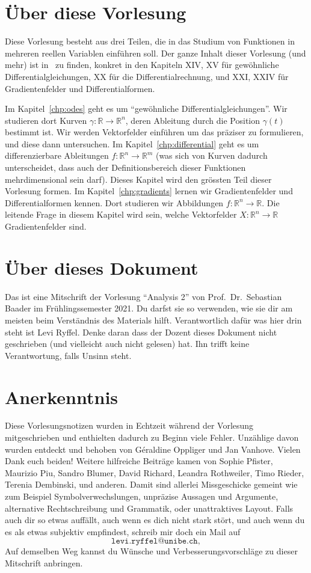 \documentclass[../main.tex]{subfiles}
\begin{document}
\section*{Über diese Vorlesung}
Diese Vorlesung besteht aus drei Teilen,
die in das Studium von Funktionen
in mehreren reellen Variablen
einführen soll. Der ganze Inhalt
dieser Vorlesung (und mehr) ist in~\cite{heuser}
zu finden,
konkret in den Kapiteln XIV, XV für
gewöhnliche Differentialgleichungen,
XX für die Differentialrechnung,
und XXI, XXIV für Gradientenfelder
und Differentialformen.

Im Kapitel~\ref{chp:odes} geht es um
``gewöhnliche Differentialgleichungen''.
Wir studieren dort Kurven
$\gamma \colon \mathbb{R} \to \mathbb{R}^n$,
deren Ableitung durch die
Position $\gamma(t)$ bestimmt ist.
Wir werden Vektorfelder einführen
um das präziser zu formulieren,
und diese dann untersuchen.
Im Kapitel~\ref{chp:differential}
geht es um differenzierbare
Ableitungen
$f \colon \mathbb{R}^n \to \mathbb{R}^m$
(was sich von Kurven dadurch unterscheidet,
dass auch der Definitionsbereich
dieser Funktionen mehrdimensional sein darf).
Dieses Kapitel wird den grössten Teil
dieser Vorlesung formen.
Im Kapitel~\ref{chp:gradients} lernen
wir Gradientenfelder und Differentialformen
kennen. Dort studieren wir
Abbildungen $f \colon\mathbb{R}^n \to \mathbb{R}$.
Die leitende Frage in diesem Kapitel wird sein,
welche Vektorfelder $X \colon \mathbb{R}^n
\to \mathbb{R}$ Gradientenfelder sind.




\section*{Über dieses Dokument}
Das ist eine Mitschrift
der Vorlesung ``Analysis 2''
von Prof.\ Dr.\ Sebastian Baader
im Frühlingssemester 2021.
Du darfst sie so verwenden,
wie sie dir am meisten
beim Verständnis des Materials
hilft.
Verantwortlich dafür was
hier drin steht ist Levi Ryffel.
Denke daran dass der Dozent dieses Dokument
nicht geschrieben (und vielleicht auch nicht gelesen) hat.
Ihn trifft keine Verantwortung, falls
Unsinn steht.

\section*{Anerkenntnis}
Diese Vorlesungsnotizen wurden in Echtzeit während der Vorlesung mitgeschrieben
und enthielten dadurch zu Beginn viele Fehler.
Unzählige davon wurden entdeckt und behoben
von Géraldine Oppliger und Jan Vanhove.
Vielen Dank euch beiden! Weitere hilfreiche Beiträge kamen
von Sophie Pfister, Maurizio Piu, Sandro Blumer, David Richard, Leandra Rothweiler,
Timo Rieder, Terenia Dembinski, und anderen.
Damit sind allerlei Missgeschicke
gemeint wie zum Beispiel
Symbolverwechslungen, unpräzise Aussagen und Argumente,
alternative Rechtschreibung und Grammatik,
oder unattraktives Layout.
Falls auch dir so etwas auffällt,
auch wenn es dich nicht stark stört,
und auch wenn du es
als etwas subjektiv empfindest,
schreib mir doch ein Mail auf
\[
\texttt{levi.ryffel@unibe.ch},
\]
Auf demselben Weg kannst du Wünsche
und Verbesserungsvorschläge
zu dieser Mitschrift
anbringen.
\end{document}
